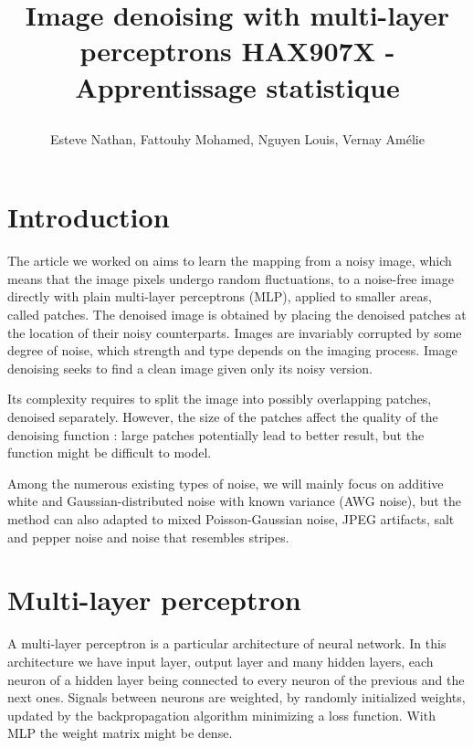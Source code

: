 \documentclass[10pt,a4paper]{article}
\author{Esteve Nathan, Fattouhy Mohamed, Nguyen Louis, Vernay Amélie}
\title{%
    \begin{minipage}\linewidth
        \centering
        Image denoising with multi-layer perceptrons
        \vskip3pt
        \large 
        HAX907X - Apprentissage statistique
    \end{minipage}
}
\newcommand{\svs}{\vspace{9pt}}
\begin{document}
\maketitle
\section{Introduction}

The article we worked on \cite{denoise} aims to learn the mapping from a noisy image, which means that the image pixels undergo random fluctuations, to a noise-free image directly with plain multi-layer perceptrons (MLP), applied to smaller areas, called patches. The denoised image is obtained by placing the denoised patches at the location of their noisy counterparts.
Images are invariably corrupted by some degree of noise, which strength and type depends on the imaging process. Image denoising seeks to find a clean image given only its noisy version.

\svs

Its complexity requires to split the image into possibly overlapping patches, denoised separately.
However, the size of the patches affect the quality of the denoising function : large patches potentially lead to better result, but the function might be difficult to model.

\svs

Among the numerous existing types of noise, we will mainly focus on additive white and Gaussian-distributed noise with known variance (AWG noise), but the method can also adapted to mixed Poisson-Gaussian noise, JPEG artifacts, salt and pepper noise and noise that resembles stripes.

\svs



\svs

\section{Multi-layer perceptron}

A multi-layer perceptron is a particular architecture of neural network. In this architecture we have input layer, output layer and many hidden layers, each neuron of a hidden layer being connected to every neuron of the previous and the next ones. Signals between neurons are weighted, by randomly initialized weights, updated by the backpropagation algorithm minimizing a loss function. With MLP the weight matrix might be dense.
\end{document}
